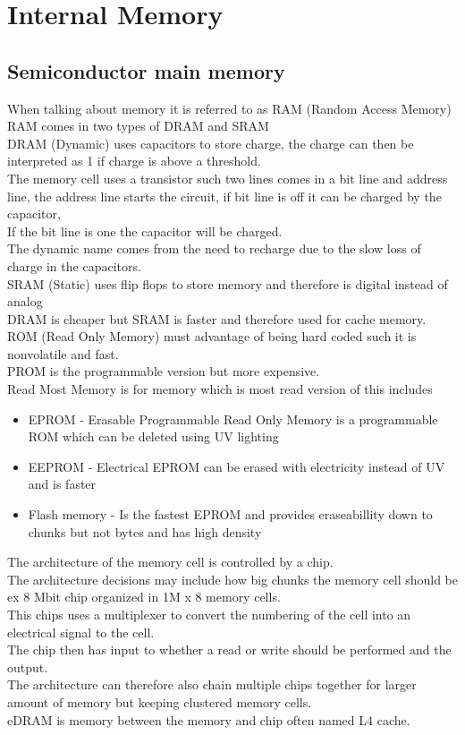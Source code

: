 \documentclass[12pt, a4paper]{article}
\begin{document}
	\section{Internal Memory}
		\subsection{Semiconductor main memory}
			When talking about memory it is referred to as RAM (Random Access Memory)
			RAM comes in two types of DRAM and SRAM\\
			DRAM (Dynamic) uses capacitors to store charge, the charge can then be interpreted as 1 if charge is above a threshold.\\
			The memory cell uses a transistor such two lines comes in a bit line and address line, the address line starts the circuit, if bit line is off it can be charged by the capacitor,\\
			If the bit line is one the capacitor will be charged.\\
			The dynamic name comes from the need to recharge due to the slow loss of charge in the capacitors.\\
			SRAM (Static) uses flip flops to store memory and therefore is digital instead of analog\\
			DRAM is cheaper but SRAM is faster and therefore used for cache memory.\\
			ROM (Read Only Memory) must advantage of being hard coded such it is nonvolatile and fast.\\
			PROM is the programmable version but more expensive.\\
			Read Most Memory is for memory which is most read version of this includes
			\begin{itemize}
				\item EPROM - Erasable Programmable Read Only Memory is a programmable ROM which can be deleted using UV lighting
				\item EEPROM - Electrical EPROM can be erased with electricity instead of UV and is faster
				\item Flash memory - Is the fastest EPROM and provides eraseabillity down to chunks but not bytes and has high density
			\end{itemize}
			The architecture of the memory cell is controlled by a chip.\\
			The architecture decisions may include how big chunks the memory cell should be ex 8 Mbit chip organized in 1M x 8 memory cells.\\
			This chips uses a multiplexer to convert the numbering of the cell into an electrical signal to the cell.\\
			The chip then has input to whether a read or write should be performed and the output.\\
			The architecture can therefore also chain multiple chips together for larger amount of memory but keeping clustered memory cells.\\
			eDRAM is memory between the memory and chip often named L4 cache.
\end{document}

